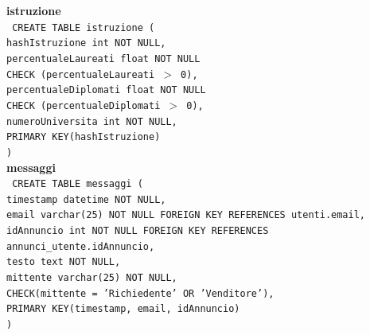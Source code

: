 \documentclass[a4paper,12pt]{report}
\begin{document}
                \noindent
                {\large \textbf{istruzione}} \\
                \texttt{
                    CREATE TABLE istruzione ( \\
                    \null\quad\quad hashIstruzione int NOT NULL, \\
                    \null\quad\quad percentualeLaureati     float       NOT NULL \\
                            \null\qquad\qquad CHECK (percentualeLaureati $>$ 0), \\
                    \null\quad\quad percentualeDiplomati    float       NOT NULL \\
                            \null\qquad\qquad CHECK (percentualeDiplomati $>$ 0), \\
                    \null\quad\quad numeroUniversita        int         NOT NULL, \\
                    \null\quad\quad PRIMARY KEY(hashIstruzione) \\
                    )
                } \\

                \noindent
                {\large \textbf{messaggi}} \\
                \texttt{
                    CREATE TABLE messaggi ( \\
                    \null\quad\quad timestamp   datetime         NOT NULL, \\
                    \null\quad\quad email      varchar(25)     NOT NULL FOREIGN KEY REFERENCES utenti.email, \\
                    \null\quad\quad idAnnuncio  int         NOT NULL FOREIGN KEY REFERENCES annunci\_utente.idAnnuncio, \\
                    \null\quad\quad testo       text  NOT NULL, \\
                    \null\quad\quad mittente    varchar(25)         NOT NULL, \\
                    \null\qquad\qquad CHECK(mittente = 'Richiedente' OR 'Venditore'), \\
                    \null\quad\quad PRIMARY KEY(timestamp, email, idAnnuncio) \\
                    )
                } \\
\end{document}
